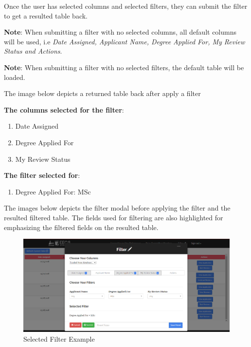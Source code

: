 \documentclass[fontsize=12pt,paper=letter,twoside]{scrartcl}
\begin{document}
Once the user has selected columns and selected filters, they can submit the filter to get a resulted table back.

\bigskip
\noindent \textbf{Note}: When submitting a filter with no selected columns, all default columns will be used, i.e \emph{Date Assigned, Applicant Name, Degree Applied For, My Review Status and Actions}.

\bigskip
\noindent \textbf{Note}: When submitting a filter with no selected filters, the default table will be loaded.

\bigskip
\noindent The image below depicts a returned table back after apply a filter

\bigskip
\noindent \textbf{The columns selected for the filter}:
\begin{enumerate}
\item Date Assigned
\item Degree Applied For
\item My Review Status
\end{enumerate}

\noindent \textbf{The filter selected for}:
\begin{enumerate}
\item Degree Applied For: MSc
\end{enumerate}

\bigskip
\noindent The images below depicts the filter modal before applying the filter and the resulted filtered table. The fields used for filtering are also highlighted for emphasizing the filtered fields on the resulted table.

\begin{figure}[!htb]
\begin{center}
\includegraphics[width=.9\textwidth]{images/example_filter.png}
\end{center}
\caption{Selected Filter Example}
\label{fig:example_filter}
\end{figure}
\end{document}
